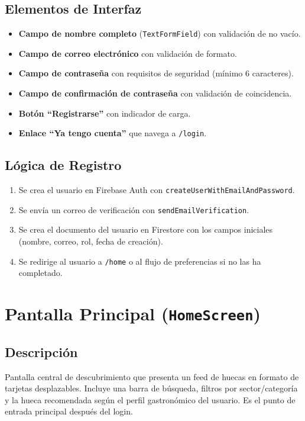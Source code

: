 \documentclass[11pt, a4paper, oneside]{report}
\begin{document}
\subsection{Elementos de Interfaz}
\begin{itemize}
  \item \textbf{Campo de nombre completo} (\texttt{TextFormField}) con validación de no vacío.
  \item \textbf{Campo de correo electrónico} con validación de formato.
  \item \textbf{Campo de contraseña} con requisitos de seguridad (mínimo 6 caracteres).
  \item \textbf{Campo de confirmación de contraseña} con validación de coincidencia.
  \item \textbf{Botón ``Registrarse''} con indicador de carga.
  \item \textbf{Enlace ``Ya tengo cuenta''} que navega a \texttt{/login}.
\end{itemize}

\subsection{Lógica de Registro}
\begin{enumerate}
  \item Se crea el usuario en Firebase Auth con \texttt{createUserWithEmailAndPassword}.
  \item Se envía un correo de verificación con \texttt{sendEmailVerification}.
  \item Se crea el documento del usuario en Firestore con los campos iniciales (nombre, correo, rol, fecha de creación).
  \item Se redirige al usuario a \texttt{/home} o al flujo de preferencias si no las ha completado.
\end{enumerate}

\section{Pantalla Principal (\texttt{HomeScreen})}

\subsection{Descripción}
Pantalla central de descubrimiento que presenta un feed de huecas en formato de tarjetas desplazables. Incluye una barra de búsqueda, filtros por sector/categoría y la hueca recomendada según el perfil gastronómico del usuario. Es el punto de entrada principal después del login.
\end{document}
